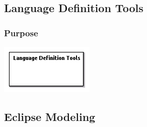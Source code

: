 \documentclass{gemoc} %
\begin{document}
\subsection{Language Definition Tools}


\subsubsection{Purpose}

\begin{center}
\includegraphics*[trim=0.0cm 0.0cm 0cm 0.0cm, clip=true]{../images/generated/Generated_Language_Definition_Tools.png}
\end{center}



\subsection{Eclipse Modeling}

\end{document}
